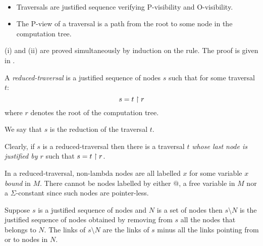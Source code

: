 \begin{property} \  \label{proper:pviewtrav_is_path}
\begin{itemize}
\item[(i)] Traversals are justified sequence verifying P-visibility and O-visibility.
\item[(ii)] The P-view of a traversal is a path from the root to some node in the computation tree.
\end{itemize}
\end{property}
(i) and (ii) are proved simultaneously by induction on the rule. The proof is given in \citep{OngLics2006}.

\begin{dfn}
A \emph{reduced-traversal} is a justified sequence of nodes $s$ such that for some traversal $t$:
$$ s = t \upharpoonright r  $$
where $r$ denotes the root of the computation tree.

We say that $s$ is the reduction of the traversal $t$.
\end{dfn}

\begin{rem}
\label{rem:redtrav} Clearly, if $s$ is a reduced-traversal then
there is a traversal $t$ \emph{whose last node is justified by $r$}
such that $s = t \upharpoonright r$.
\end{rem}

In a reduced-traversal, non-lambda nodes are all labelled
$x$ for some variable $x$ \emph{bound} in $M$. There cannot be nodes
labelled by either $@$, a free variable in $M$ nor a
$\Sigma$-constant since such nodes are pointer-less.

\begin{dfn}
Suppose $s$ is a justified sequence of nodes and $N$ is a set of nodes then $s \setminus N$ is the justified sequence of nodes
obtained by removing from $s$ all the nodes that belongs to $N$.
The links of $s \setminus N$ are the links of $s$ minus all the links pointing from or to nodes in $N$.
\end{dfn}

